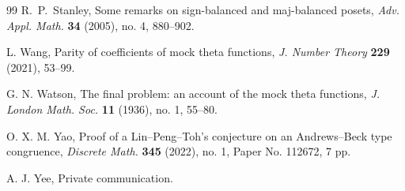 \documentclass[12pt,reqno]{amsart}
\numberwithin{equation}{section}
\theoremstyle{plain}
\theoremstyle{definition}
\begin{document}
\begin{thebibliography}{99}
R.~P.~Stanley,
Some remarks on sign-balanced and maj-balanced posets,
\textit{Adv. Appl. Math.} \textbf{34} (2005), no. 4, 880--902.


L. Wang,
Parity of coefficients of mock theta functions,
\textit{J. Number Theory} \textbf{229} (2021), 53--99.


G. N. Watson,
The final problem: an account of the mock theta functions,
\textit{J. London Math. Soc.} \textbf{11} (1936), no. 1, 55--80.


O. X. M. Yao,
Proof of a Lin--Peng--Toh's conjecture on an Andrews--Beck type congruence,
\textit{Discrete Math.} \textbf{345} (2022), no. 1, Paper No. 112672, 7 pp.


A. J. Yee, Private communication.


\end{thebibliography}
\end{document}
